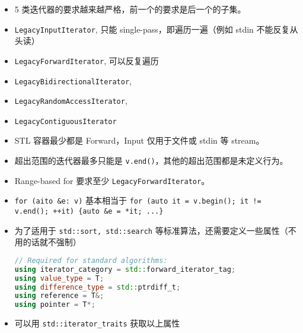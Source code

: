 
\begin{itemize}
\item 5 类迭代器的要求越来越严格，前一个的要求是后一个的子集。
\item \verb`LegacyInputIterator`, 只能 single-pass，即遍历一遍（例如 stdin 不能反复从头读）
\item \verb`LegacyForwardIterator`, 可以反复遍历
\item \verb`LegacyBidirectionalIterator`,
\item \verb`LegacyRandomAccessIterator`,
\item \verb`LegacyContiguousIterator`
\item STL 容器最少都是 Forward，Input 仅用于文件或 stdin 等 stream。
\item 超出范围的迭代器最多只能是 \verb`v.end()`，其他的超出范围都是未定义行为。
\item Range-based for 要求至少 \verb`LegacyForwardIterator`。
\item \verb`for (aito &e: v)` 基本相当于 \verb`for (auto it = v.begin(); it != v.end(); ++it) {auto &e = *it; ...}`
\item 为了适用于 \verb`std::sort, std::search` 等标准算法，还需要定义一些属性（不用的话就不强制）
\begin{lstlisting}[language=cpp]
// Required for standard algorithms:
using iterator_category = std::forward_iterator_tag;
using value_type = T;
using difference_type = std::ptrdiff_t;
using reference = T&;
using pointer = T*;
\end{lstlisting}
\item 可以用 \verb`std::iterator_traits` 获取以上属性
\end{itemize}
